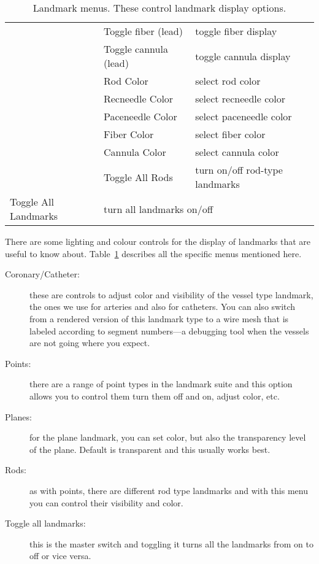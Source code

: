 \begin{table}[ht]
\begin{center}
\begin{tabular}{|l|p{1.5in}|p{3 in}|}
    & Toggle fiber (lead) & toggle fiber display \\ 
    & Toggle cannula (lead) & toggle cannula display \\ 
    & Rod Color & select rod color \\
    & Recneedle Color & select recneedle color \\
    & Paceneedle Color & select paceneedle color \\
    & Fiber Color & select fiber color \\
    & Cannula Color & select cannula color \\
    & Toggle All Rods & turn on/off rod-type landmarks \\ \hline
    Toggle All Landmarks & \multicolumn{2}{|l|}{turn all landmarks on/off} \\
    \hline
    \end{tabular}
  \end{center}
\caption{Landmark menus.  These control landmark display options.}
\label{table:landmarks} 
\end{table}

There are some lighting and colour controls for the display of landmarks
that are useful to know about.  Table~\ref{table:landmarks} describes all
the specific menus mentioned here.

\begin{description}
  \item [Coronary/Catheter: ] these are controls to adjust color and
        visibility of the vessel type landmark, the ones we use for
        arteries and also for catheters.  You can also switch from a
        rendered version of this landmark type to a wire mesh that is
        labeled according to segment numbers---a debugging tool when the
        vessels are not going where you expect.
  \item [Points: ] there are a range of point types in the landmark suite
        and this option allows you to control them turn them off and on,
        adjust color, etc.
  \item [Planes: ] for the plane landmark, you can set color, but also the
        transparency level of the plane.  Default is transparent and this
        usually works best.
  \item [Rods: ] as with points, there are different rod type landmarks and
        with this menu you can control their visibility and color.
  \item [Toggle all landmarks: ] this is the master switch and toggling it
        turns all the landmarks from on to off or vice versa.

\end{description}


